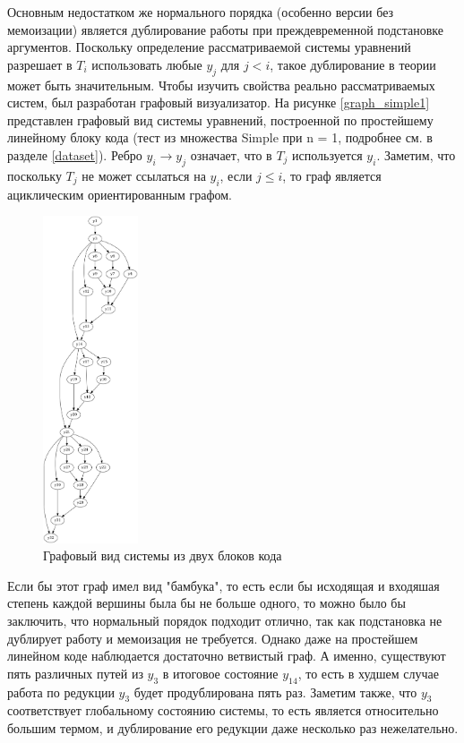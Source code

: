\documentclass[../diploma.tex]{subfiles}
\begin{document}
Основным недостатком же нормального порядка (особенно версии без мемоизации) является дублирование работы при преждевременной подстановке аргументов. Поскольку определение рассматриваемой системы уравнений разрешает в $T_i$ использовать любые $y_j$ для $j < i$, такое дублирование в теории может быть значительным. Чтобы изучить свойства реально рассматриваемых систем, был разработан графовый визуализатор. На рисунке \ref{graph_simple1} представлен графовый вид системы уравнений, построенной по простейшему линейному блоку кода (тест из множества Simple при n = 1, подробнее см. в разделе \ref{dataset}). Ребро $y_i \rightarrow y_j$ означает, что в $T_j$ используется $y_i$. Заметим, что поскольку $T_j$ не может ссылаться на $y_i$, если $j \le i$, то граф является ациклическим ориентированным графом. 

\begin{figure}
    \centering
    \includegraphics[width=0.25\textwidth]{graph_simple2.png}
    \caption{Графовый вид системы из двух блоков кода}\label{graph_simple2}
\end{figure}

Если бы этот граф имел вид "бамбука", то есть если бы исходящая и входяшая степень каждой вершины была бы не больше одного, то можно было бы заключить, что нормальный порядок подходит отлично, так как подстановка не дублирует работу и мемоизация не требуется. Однако даже на простейшем линейном коде наблюдается достаточно ветвистый граф. А именно, существуют пять различных путей из $y_3$ в итоговое состояние $y_{14}$, то есть в худшем случае работа по редукции $y_3$ будет продублирована пять раз. Заметим также, что $y_3$ соответствует глобальному состоянию системы, то есть является относительно большим термом, и дублирование его редукции даже несколько раз нежелательно.
\end{document}
